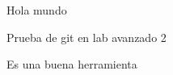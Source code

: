 \documentclass{article}
\begin{document}
Hola mundo 

Prueba de git en lab avanzado 2

Es una buena herramienta
\end{document}
